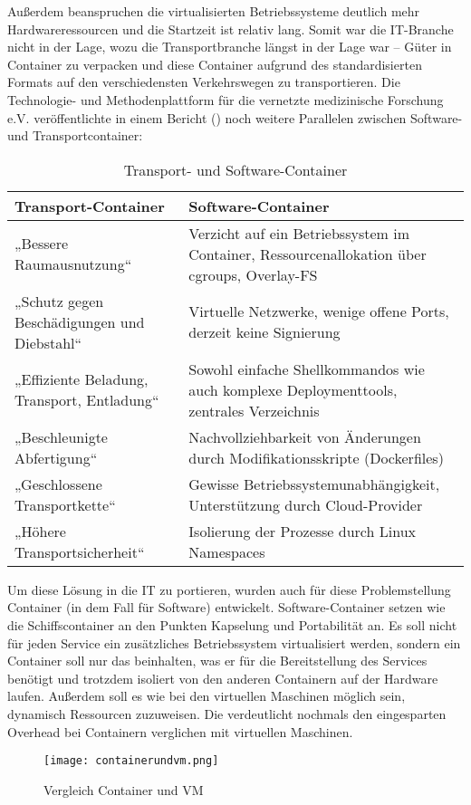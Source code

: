 Außerdem beanspruchen die virtualisierten Betriebssysteme deutlich mehr Hardwareressourcen und die Startzeit ist relativ lang.
Somit war die IT-Branche nicht in der Lage, wozu die Transportbranche längst in der Lage war -- Güter in Container zu verpacken und diese Container aufgrund des standardisierten Formats auf den verschiedensten Verkehrswegen zu transportieren. Die Technologie- und Methodenplattform für die vernetzte medizinische Forschung e.V. veröffentlichte in einem Bericht (\citep{TUM}) noch weitere Parallelen zwischen Software- und Transportcontainer:
\begin{table}[h]
\def\arraystretch{1.5}%
\begin{tabular}{|p{}|p{}|}\hline
	\textbf{Transport-Container} & \textbf{Software-Container} \\ \hline
	„Bessere Raumausnutzung“ & Verzicht auf ein Betriebssystem im Container, Ressourcenallokation über cgroups, Overlay-FS \\ \hline
	„Schutz gegen Beschädigungen und Diebstahl“ & Virtuelle Netzwerke, wenige offene Ports, derzeit keine Signierung \\ \hline
	„Effiziente Beladung, Transport, Entladung“ & Sowohl einfache Shellkommandos wie auch komplexe Deploymenttools, zentrales Verzeichnis \\ \hline
	„Beschleunigte Abfertigung“ & Nachvollziehbarkeit von Änderungen durch Modifikationsskripte (Dockerfiles) \\ \hline
	„Geschlossene Transportkette“ &Gewisse Betriebssystemunabhängigkeit, Unterstützung durch Cloud-Provider \\ \hline
	„Höhere Transportsicherheit“ & Isolierung der Prozesse durch Linux Namespaces \\ \hline
\end{tabular}
\caption{Transport- und Software-Container}
\end{table}

Um diese Lösung in die IT zu portieren, wurden auch für diese Problemstellung Container (in dem Fall für Software) entwickelt.
Software-Container setzen wie die Schiffscontainer an den Punkten Kapselung und Portabilität an.
Es soll nicht für jeden Service ein zusätzliches Betriebssystem virtualisiert werden, sondern ein Container soll nur das beinhalten, was er für die Bereitstellung des Services benötigt und trotzdem isoliert von den anderen Containern auf der Hardware laufen.
Außerdem soll es wie bei den virtuellen Maschinen möglich sein, dynamisch Ressourcen zuzuweisen. \citep{12005068320161201, redhat}
Die  verdeutlicht nochmals den eingesparten Overhead bei Containern verglichen mit virtuellen Maschinen.
\begin{figure}[H]
	\begin{center}
		\texttt{[image: containerundvm.png]}
	\end{center}
	\caption[Vergleich Container und VM]{Vergleich Container und VM \footnotemark}
	\label{fig:VergleichContainerVM}
\end{figure}
\newpage


